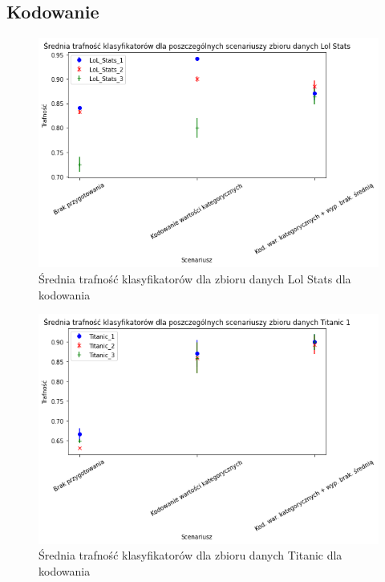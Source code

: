 \documentclass{book}
\begin{document}
\subsection{Kodowanie}

\begin{figure}[H]
    \centerline{\includegraphics[scale=0.8]{Lol_Stats_Avg_Kodowanie}}
    \centering
    \caption{Średnia trafność klasyfikatorów dla zbioru danych Lol Stats 
    dla kodowania}
    \end{figure}

\begin{figure}[H]
    \centerline{\includegraphics[scale=0.8]{Titanic_Avg_Kodowanie}}
    \centering
    \caption{Średnia trafność klasyfikatorów dla zbioru danych Titanic 
    dla kodowania}
    \end{figure}
\end{document}
